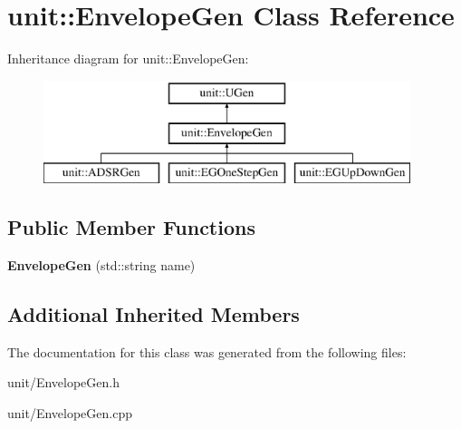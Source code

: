 \hypertarget{classunit_1_1EnvelopeGen}{}\section{unit\+:\+:Envelope\+Gen Class Reference}
\label{classunit_1_1EnvelopeGen}
Inheritance diagram for unit\+:\+:Envelope\+Gen\+:\begin{figure}[H]
\begin{center}
\leavevmode
\includegraphics[height=3.000000cm]{classunit_1_1EnvelopeGen}
\end{center}
\end{figure}
\subsection*{Public Member Functions}
\begin{DoxyCompactItemize}
\item 
{\bfseries Envelope\+Gen} (std\+::string name)\hypertarget{classunit_1_1EnvelopeGen_a2925f305c08e3316c3b1cbdabea03bde}{}\label{classunit_1_1EnvelopeGen_a2925f305c08e3316c3b1cbdabea03bde}

\end{DoxyCompactItemize}
\subsection*{Additional Inherited Members}


The documentation for this class was generated from the following files\+:\begin{DoxyCompactItemize}
\item 
unit/Envelope\+Gen.\+h\item 
unit/Envelope\+Gen.\+cpp\end{DoxyCompactItemize}
